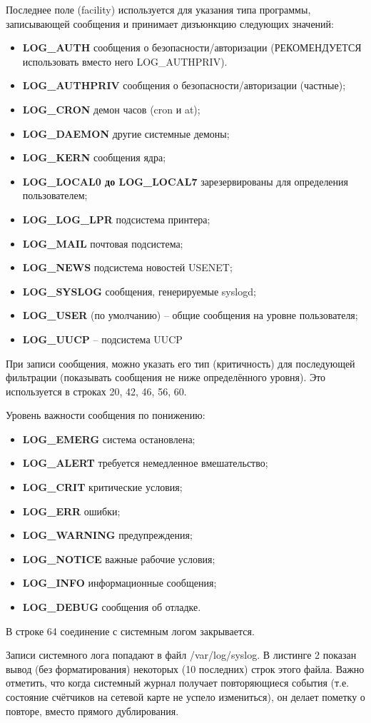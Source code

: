 Последнее поле (facility) используется для указания типа программы, записывающей сообщения и принимает дизъюнкцию следующих значений:
\begin{itemize}
\item \textbf{LOG\_AUTH} сообщения о безопасности/авторизации (РЕКОМЕНДУЕТСЯ использовать вместо него LOG\_AUTHPRIV). 
\item \textbf{LOG\_AUTHPRIV} сообщения о безопасности/авторизации (частные); 
\item \textbf{LOG\_CRON} демон часов (cron и at); 
\item \textbf{LOG\_DAEMON} другие системные демоны; 
\item \textbf{LOG\_KERN} сообщения ядра; 
\item \textbf{LOG\_LOCAL0 до LOG\_LOCAL7} зарезервированы для определения пользователем; 
\item \textbf{LOG\_LOG\_LPR} подсистема принтера; 
\item \textbf{LOG\_MAIL} почтовая подсистема; 
\item \textbf{LOG\_NEWS} подсистема новостей USENET; 
\item \textbf{LOG\_SYSLOG} сообщения, генерируемые syslogd; 
\item \textbf{LOG\_USER} (по умолчанию) -- общие сообщения на уровне пользователя;
\item \textbf{LOG\_UUCP} -- подсистема UUCP 
\end{itemize}

При записи сообщения, можно указать его тип (критичность) для последующей фильтрации (показывать сообщения не ниже определённого уровня). Это используется в строках 20, 42, 46, 56, 60.

Уровень важности сообщения по понижению:

\begin{itemize}
\item \textbf{LOG\_EMERG} система остановлена; 
\item \textbf{LOG\_ALERT} требуется немедленное вмешательство; 
\item \textbf{LOG\_CRIT} критические условия; 
\item \textbf{LOG\_ERR} ошибки; 
\item \textbf{LOG\_WARNING} предупреждения; 
\item \textbf{LOG\_NOTICE} важные рабочие условия; 
\item \textbf{LOG\_INFO} информационные сообщения; 
\item \textbf{LOG\_DEBUG} сообщения об отладке.
\end{itemize}

В строке 64 соединение с системным логом закрывается.

Записи системного лога попадают в файл /var/log/syslog. В листинге 2 показан вывод (без форматирования) некоторых (10 последних) строк этого файла. Важно отметить, что когда системный журнал получает повторяющиеся события (т.е. состояние счётчиков на сетевой карте не успело измениться), он делает пометку о повторе, вместо прямого дублирования.


